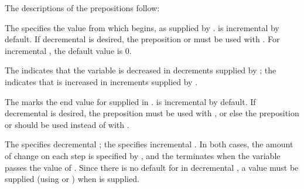 \beginlist                 
 
 
 
\endlist
 
The descriptions of the prepositions follow:
 
\beginlist
{}
 
The   specifies the value from which
 begins, as supplied by .  
 is incremental by default.  If 
decremental  is desired, 
the preposition  
or  must be used with .  For incremental
, the default  value is 0.

 
The   
indicates that the variable  is decreased in decrements
supplied by ; the   indicates that 
 is increased in increments supplied by .
 
                                                  
The   marks the end value
for  supplied in .
 is incremental by default.
If decremental  is desired, 
the preposition  must be used with ,
or else the preposition  or  should be used instead
   of  with .
              
 
The   specifies decremental ;
the   specifies incremental .
In both cases, the amount of change on each step is specified by ,
and the  terminates when the variable  passes 
the value of .
Since there is no default for  in decremental ,
a  value must be supplied (using  or )
when  is supplied.
 
 
